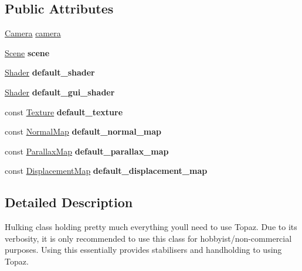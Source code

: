 \subsection*{Public Attributes}
\begin{DoxyCompactItemize}
\item 
\mbox{\hyperlink{class_camera}{Camera}} \mbox{\hyperlink{class_engine_a25924c4045f695c4fb6b6439777b1920}{camera}}
\item 
\mbox{\label{class_engine_a24d0973c7d00cf57a07e30f35c87fc64}} 
\mbox{\hyperlink{class_scene}{Scene}} {\bfseries scene}
\item 
\mbox{\label{class_engine_a1103187e7ed35b93dca517172993f196}} 
\mbox{\hyperlink{class_shader}{Shader}} {\bfseries default\+\_\+shader}
\item 
\mbox{\label{class_engine_a3f92dfc32aae2942f2c9409e8ed8438b}} 
\mbox{\hyperlink{class_shader}{Shader}} {\bfseries default\+\_\+gui\+\_\+shader}
\item 
\mbox{\label{class_engine_a906df11eaf663141f086919fc4bf88b8}} 
const \mbox{\hyperlink{class_texture}{Texture}} {\bfseries default\+\_\+texture}
\item 
\mbox{\label{class_engine_ae060d7cef39dc18cf663e839073931ae}} 
const \mbox{\hyperlink{class_normal_map}{Normal\+Map}} {\bfseries default\+\_\+normal\+\_\+map}
\item 
\mbox{\label{class_engine_a589a3bd13ab32cb0e955b1a7e2c9c49a}} 
const \mbox{\hyperlink{class_parallax_map}{Parallax\+Map}} {\bfseries default\+\_\+parallax\+\_\+map}
\item 
\mbox{\label{class_engine_a71eb40026060060b3814f3bdca169631}} 
const \mbox{\hyperlink{class_displacement_map}{Displacement\+Map}} {\bfseries default\+\_\+displacement\+\_\+map}
\end{DoxyCompactItemize}


\subsection{Detailed Description}
Hulking class holding pretty much everything you\textquotesingle{}ll need to use Topaz. Due to its verbosity, it is only recommended to use this class for hobbyist/non-\/commercial purposes. Using this essentially provides stabilisers and handholding to using Topaz. 

